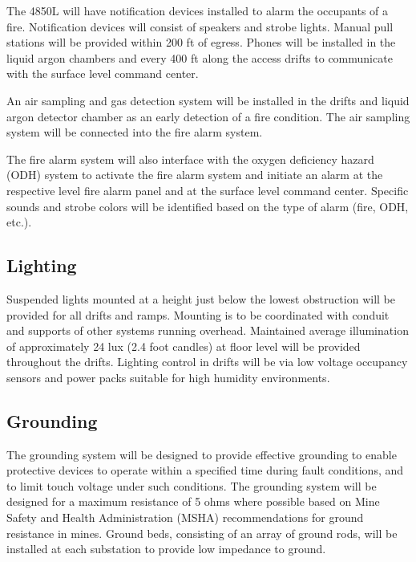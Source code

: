 The 4850L will have notification devices installed to alarm the occupants of a fire. Notification devices will consist of speakers and strobe lights. Manual pull stations will be provided within 200 ft of egress. Phones will be installed in the liquid argon chambers and every 400 ft along the access drifts to communicate with the surface level command center.

An air sampling and gas detection system will be installed in the drifts and liquid argon detector chamber as an early detection of a fire condition. The air sampling system will be connected into the fire alarm system.

The fire alarm system will also interface with the oxygen deficiency hazard (ODH) system to activate the fire alarm system and initiate an alarm at the respective level fire alarm panel and at the surface level command center. Specific sounds and strobe colors will be identified based on the type of alarm (fire, ODH, etc.).

\subsection{Lighting}
\label{sec:fscf-und-light}

Suspended lights mounted at a height just below the lowest obstruction will be provided for all drifts and ramps. Mounting is to be coordinated with conduit and supports of other systems running overhead. Maintained average illumination of approximately 24 lux (2.4 foot candles) at floor level will be provided throughout the drifts. Lighting control in drifts will be via low voltage occupancy sensors and power packs suitable for high humidity environments.

\subsection{Grounding}
\label{sec:fscf-und-grounding}

The grounding system will be designed to provide effective grounding to enable protective devices to operate within a specified time during fault conditions, and to limit touch voltage under such conditions. The grounding system will be designed for a maximum resistance of 5 ohms where possible based on Mine Safety and Health Administration (MSHA) recommendations for ground resistance in mines. Ground beds, consisting of an array of ground rods, will be installed at each substation to provide low impedance to ground.


